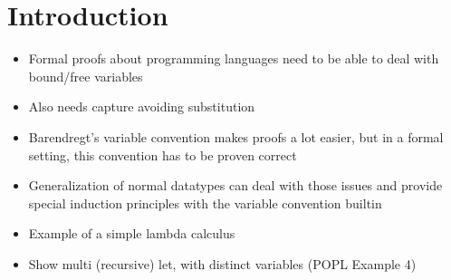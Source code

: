 \chapter{Introduction}\label{chapter:introduction}

\begin{itemize}
\item{Formal proofs about programming languages need to be able to deal with bound/free variables}
\item{Also needs capture avoiding substitution}
\item{Barendregt's variable convention makes proofs a lot easier, but in a formal setting, this convention has to be proven correct}
\item{Generalization of normal datatypes can deal with those issues and provide special induction principles with the variable convention builtin}
\item{Example of a simple lambda calculus}
\item{Show multi (recursive) let, with distinct variables (POPL Example 4)}
\end{itemize}
